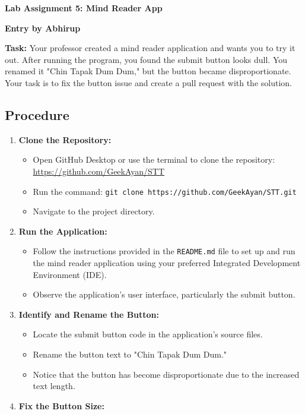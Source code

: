 \documentclass{article}
\begin{document}
\newpage
\textbf{Lab Assignment 5: Mind Reader App}

\begin{center}
    \textbf{Entry by Abhirup}
\end{center}


\textbf{Task:} Your professor created a mind reader application and wants you to try it out. After running the program, you found the submit button looks dull. You renamed it "Chin Tapak Dum Dum," but the button became disproportionate. Your task is to fix the button issue and create a pull request with the solution.

\subsection*{Procedure}
\begin{enumerate}[label=\arabic*.]
    \item \textbf{Clone the Repository:}
    \begin{itemize}
        \item Open GitHub Desktop or use the terminal to clone the repository: \url{https://github.com/GeekAyan/STT}
        \item Run the command: \texttt{git clone https://github.com/GeekAyan/STT.git}
        \item Navigate to the project directory.
    \end{itemize}
    \item \textbf{Run the Application:}
    \begin{itemize}
        \item Follow the instructions provided in the \texttt{README.md} file to set up and run the mind reader application using your preferred Integrated Development Environment (IDE).
        \item Observe the application's user interface, particularly the submit button.
    \end{itemize}
    \item \textbf{Identify and Rename the Button:}
    \begin{itemize}
        \item Locate the submit button code in the application’s source files.
        \item Rename the button text to "Chin Tapak Dum Dum."
        \item Notice that the button has become disproportionate due to the increased text length.
    \end{itemize}
    \item \textbf{Fix the Button Size:}

\end{enumerate}
\end{document}
